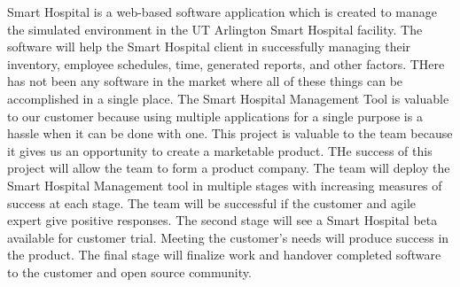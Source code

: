 Smart Hospital is a web-based software application which is created to manage the simulated environment in the UT Arlington Smart Hospital facility. The software will help the Smart Hospital client in successfully managing their inventory, employee schedules, time, generated reports, and other factors. THere has not been any software in the market where all of these things can be accomplished in a single place. The Smart Hospital Management Tool is valuable to our customer because using multiple applications for a single purpose is a hassle when it can be done with one. This project is valuable to the team because it gives us an opportunity to create a marketable product. THe success of this project will allow the team to form a product company. The team will deploy the Smart Hospital Management tool in multiple stages with increasing measures of success at each stage. The team will be successful if the customer and agile expert give positive responses. The second stage will see a Smart Hospital beta available for customer trial. Meeting the customer's needs will produce success in the product. The final stage will finalize work and handover completed software to the customer and open source community.